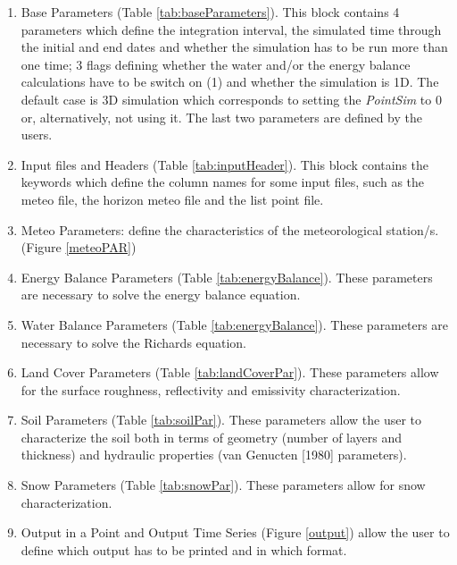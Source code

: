  \begin{enumerate}
\item Base Parameters (Table \ref{tab:baseParameters}). This block contains 4 parameters which define the integration interval, the simulated time through the initial and end dates and whether the simulation has to be run more than one time; 3 flags defining whether the water and/or the energy balance calculations have to be switch on (1) and whether the simulation is 1D. The default case is 3D simulation which corresponds to setting the {\it PointSim} to 0 or, alternatively, not using it. The last two parameters are defined by the users.

\item  Input files and Headers (Table \ref{tab:inputHeader}). This block contains the keywords which define the column names for some input files, such as the meteo file, the horizon meteo file and the list point file.

\item  Meteo Parameters: define the characteristics of the meteorological station/s. (Figure \ref{meteoPAR})
\item  Energy Balance Parameters (Table \ref{tab:energyBalance}). These parameters are necessary to solve the energy balance equation.
\item Water Balance Parameters (Table \ref{tab:energyBalance}). These parameters are necessary to solve the Richards equation.
\item Land Cover Parameters (Table \ref{tab:landCoverPar}). These parameters allow for the surface roughness, reflectivity and emissivity characterization.

\item  Soil Parameters (Table \ref{tab:soilPar}). These parameters allow the user to characterize the soil both in terms of geometry (number of layers and thickness) and hydraulic properties (van Genucten [1980] parameters).

\item Snow Parameters (Table \ref{tab:snowPar}). These parameters allow for snow characterization.

\item Output in a Point and Output Time Series (Figure \ref{output}) allow the user to define which output has to be printed and in which format.
\end{enumerate}


